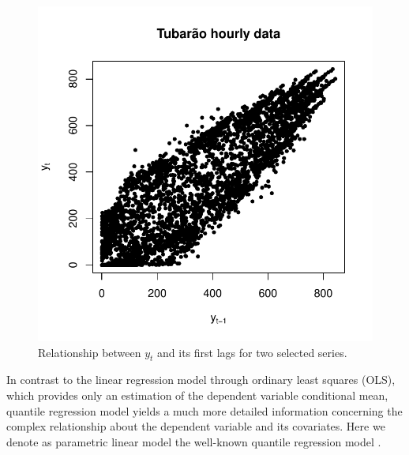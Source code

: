 \begin{figure}
\begin{minipage}[t]{\linewidth}
\begin{minipage}[t]{0.45\linewidth}
      \centering     \includegraphics[width=\textwidth]{Figuras/Solar-exemplos/scatterplot}
    \end{minipage}
  \end{minipage}
  \caption{Relationship between $y_t$ and its first lags for two selected series.}
  \label{fig:scatterplot-1lag}
\end{figure}

In contrast to the linear regression model through ordinary least squares (OLS), which provides only an estimation of the dependent variable conditional mean, quantile regression model yields a much more detailed information concerning the complex relationship about the dependent variable and its covariates. Here we denote as parametric linear model the well-known quantile regression model \cite{koenker2005quantile}.

